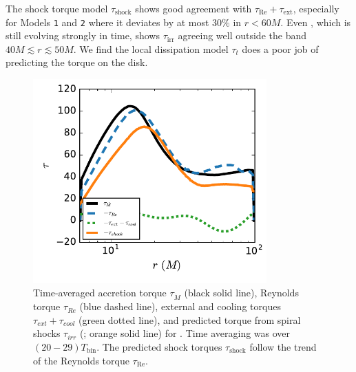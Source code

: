 The shock torque model $\tau_\text{shock}$ shows good agreement with $\tau_\text{Re}+\tau_\text{ext}$, especially for Models \texttt{1} and \texttt{2} where it deviates by at most $30\%$ in $r < 60M$.  Even , which is still evolving strongly in time, shows $\tau_\text{irr}$ agreeing well outside the band $40M \lesssim r \lesssim 50M$.  We find the local dissipation model $\tau_t$ does a poor job of predicting the torque on the disk.

\begin{figure}
\begin{center}
	\includegraphics[width=0.8\textwidth]{figures/minidisk/q011_m2_torque_r.pdf}
\end{center}
	\caption{ Time-averaged accretion torque $\tau_{\dot{M}}$ (black solid line), Reynolds torque $\tau_{Re}$ (blue dashed line), external and cooling torques $\tau_{ext}+\tau_{cool}$ (green dotted line), and predicted torque from spiral shocks $\tau_{irr}$ (; orange solid line) for . Time averaging was over $(20-29)T_\text{bin}$.  The predicted shock torques $\tau_\text{shock}$ follow the trend of the Reynolds torque $\tau_\text{Re}$.}  
\end{figure}

